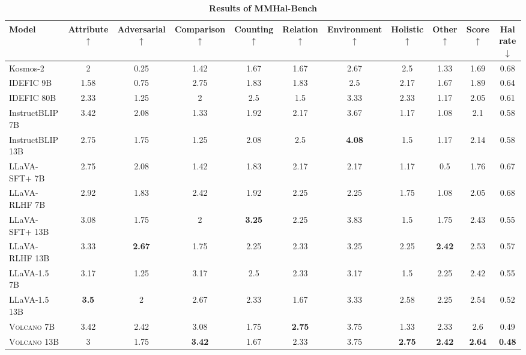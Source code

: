 \documentclass[11pt]{article}
\newcommand{\Ours}{\textsc{Volcano}}
\begin{document}
\begin{table*}[t]
\tiny
\centering
\begin{tabular}{lcccccccc|cc}
\toprule
Model  & Attribute $\uparrow$ &	Adversarial $\uparrow$ & 	Comparison $\uparrow$ &	Counting $\uparrow$ &	Relation $\uparrow$ &	Environment $\uparrow$	& Holistic	$\uparrow$ & Other $\uparrow$ & Score $\uparrow$ & Hal rate $\downarrow$\\
\midrule
Kosmos-2	&	2	&0.25&	1.42&	1.67&	1.67&	2.67&	2.5&	1.33 & 1.69& 	0.68\\
IDEFIC 9B	&	1.58&	0.75&	2.75&	1.83&	1.83&	2.5&	2.17&	1.67 &1.89&	0.64\\
IDEFIC 80B	&	2.33&	1.25&	2&	2.5&	1.5&	3.33&	2.33&	1.17 &2.05&	0.61\\
InstructBLIP 7B	&	3.42&	2.08&	1.33&	1.92&	2.17&	3.67&	1.17&	1.08 &2.1	&0.58\\
InstructBLIP 13B&	2.75&	1.75&	1.25&	2.08&	2.5&	\textbf{4.08}&	1.5&	1.17 &	2.14	&0.58\\
LLaVA-SFT+ 7B&	2.75&	2.08&	1.42&	1.83&	2.17&	2.17&	1.17&	0.5 &	1.76&	0.67\\
LLaVA-RLHF 7B&	2.92&	1.83&	2.42&	1.92&	2.25&	2.25&	1.75&	1.08 &	2.05&	0.68\\
LLaVA-SFT+ 13B&	3.08&	1.75&	2&	\textbf{3.25}&	2.25&	3.83&	1.5&	1.75 & 2.43&	0.55\\
LLaVA-RLHF 13B&	3.33&	\textbf{2.67}&	1.75&	2.25&	2.33&	3.25&	2.25&	\textbf{2.42} &	2.53&	0.57\\
\midrule
LLaVA-1.5 7B&	3.17&	1.25&	3.17&	2.5&	2.33&	3.17&	1.5&	2.25 &	2.42&	0.55\\
LLaVA-1.5 13B&	\textbf{3.5}&	2&	2.67&	2.33&	1.67&	3.33&	2.58&	2.25 &	2.54&	0.52\\
{\Ours} 7B&	3.42&	2.42&	3.08&	1.75&	\textbf{2.75}&	3.75&	1.33&	2.33 &	2.6&	0.49\\
{\Ours} 13B&	3&	1.75&	\textbf{3.42}&	1.67&	2.33&	3.75&	\textbf{2.75}&	\textbf{2.42} &	\textbf{2.64}&	\textbf{0.48}\\
\bottomrule
\end{tabular}
\caption{\textbf{Results of MMHal-Bench}}
\label{tab:Table6}
\end{table*}
\end{document}
